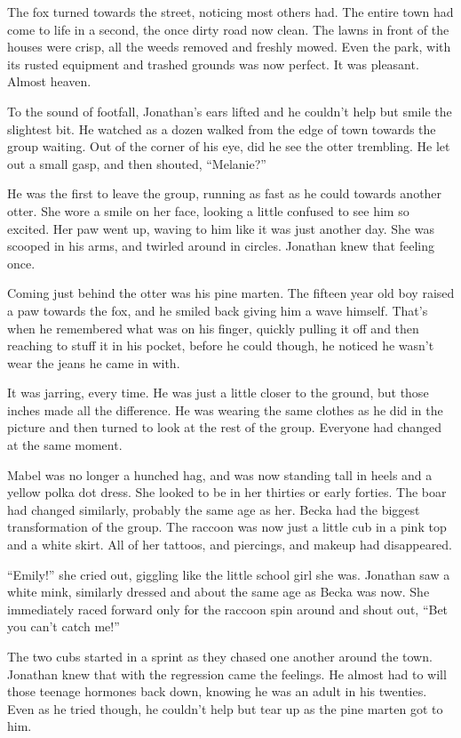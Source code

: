 The fox turned towards the street, noticing most others had. The entire
town had come to life in a second, the once dirty road now clean. The
lawns in front of the houses were crisp, all the weeds removed and
freshly mowed. Even the park, with its rusted equipment and trashed
grounds was now perfect. It was pleasant. Almost heaven.

To the sound of footfall, Jonathan's ears lifted and he couldn't help
but smile the slightest bit. He watched as a dozen walked from the edge
of town towards the group waiting. Out of the corner of his eye, did he
see the otter trembling. He let out a small gasp, and then shouted,
``Melanie?''

He was the first to leave the group, running as fast as he could towards
another otter. She wore a smile on her face, looking a little confused
to see him so excited. Her paw went up, waving to him like it was just
another day. She was scooped in his arms, and twirled around in circles.
Jonathan knew that feeling once.

Coming just behind the otter was his pine marten. The fifteen year old
boy raised a paw towards the fox, and he smiled back giving him a wave
himself. That's when he remembered what was on his finger, quickly
pulling it off and then reaching to stuff it in his pocket, before he
could though, he noticed he wasn't wear the jeans he came in with.

It was jarring, every time. He was just a little closer to the ground,
but those inches made all the difference. He was wearing the same
clothes as he did in the picture and then turned to look at the rest of
the group. Everyone had changed at the same moment.

Mabel was no longer a hunched hag, and was now standing tall in heels
and a yellow polka dot dress. She looked to be in her thirties or early
forties. The boar had changed similarly, probably the same age as her.
Becka had the biggest transformation of the group. The raccoon was now
just a little cub in a pink top and a white skirt. All of her tattoos,
and piercings, and makeup had disappeared.

``Emily!'' she cried out, giggling like the little school girl she was.
Jonathan saw a white mink, similarly dressed and about the same age as
Becka was now. She immediately raced forward only for the raccoon spin
around and shout out, ``Bet you can't catch me!''

The two cubs started in a sprint as they chased one another around the
town. Jonathan knew that with the regression came the feelings. He
almost had to will those teenage hormones back down, knowing he was an
adult in his twenties. Even as he tried though, he couldn't help but
tear up as the pine marten got to him.

